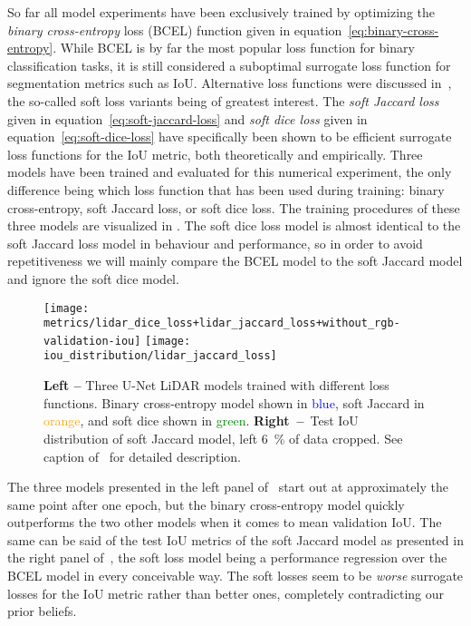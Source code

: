 So far all model experiments have been exclusively trained by optimizing the \textit{binary cross-entropy} loss (BCEL) function given in equation~\eqref{eq:binary-cross-entropy}.
While BCEL is by far the most popular loss function for binary classification tasks, it is still considered a suboptimal surrogate loss function for segmentation metrics such as IoU.
Alternative loss functions were discussed in~, the so-called soft loss variants being of greatest interest.
The \textit{soft Jaccard loss} given in equation~\eqref{eq:soft-jaccard-loss} and \textit{soft dice loss} given in equation~\eqref{eq:soft-dice-loss} have specifically been shown to be efficient surrogate loss functions for the IoU metric, both theoretically and empirically.
Three models have been trained and evaluated for this numerical experiment, the only difference being which loss function that has been used during training: binary cross-entropy, soft Jaccard loss, or soft dice loss.
The training procedures of these three models are visualized in .
The soft dice loss model is almost identical to the soft Jaccard loss model in behaviour and performance, so in order to avoid repetitiveness we will mainly compare the BCEL model to the soft Jaccard model and ignore the soft dice model.

\begin{figure}[H]
  \centering
  \texttt{[image: metrics/lidar\_dice\_loss+lidar\_jaccard\_loss+without\_rgb-validation-iou]}
  \texttt{[image: iou\_distribution/lidar\_jaccard\_loss]}
  \caption{%
    \textbf{Left --} Three U-Net LiDAR models trained with different loss functions.
    Binary cross-entropy model shown in \textcolor{blue}{blue}, soft Jaccard in \textcolor{orange}{orange}, and soft dice shown in \textcolor{green}{green}.
    \textbf{Right~--}~Test IoU distribution of soft Jaccard model, left \SI{6}{\percent} of data cropped.
    See caption of~ for detailed description.
  }%
  \label{fig:losses-training}
\end{figure}
\vspace{-0.5\baselineskip}
The three models presented in the left panel of~ start out at approximately the same point after one epoch, but the binary cross-entropy model quickly outperforms the two other models when it comes to mean validation IoU.
The same can be said of the test IoU metrics of the soft Jaccard model as presented in the right panel of~, the soft loss model being a performance regression over the BCEL model in every conceivable way.
The soft losses seem to be \emph{worse} surrogate losses for the IoU metric rather than better ones, completely contradicting our prior beliefs.

